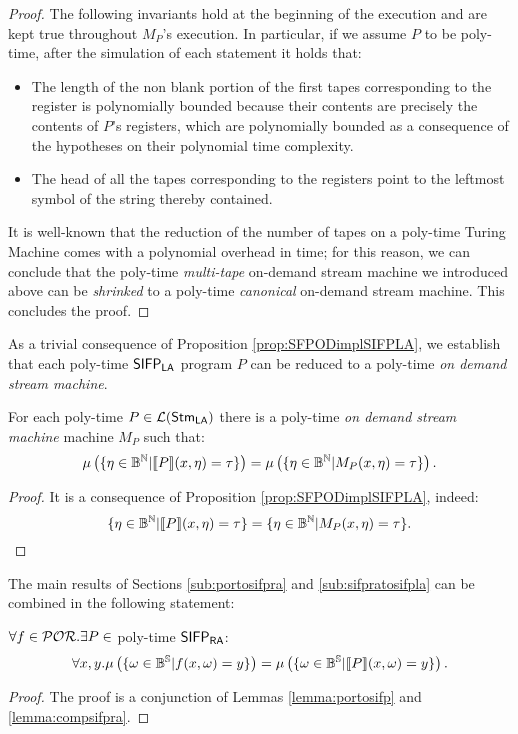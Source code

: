\begin{proof}
The following invariants hold at the beginning of the execution and are kept true
throughout $M_P$'s execution. In particular, if we assume $P$ to be poly-time,
after the simulation of each statement it holds that:

\begin{itemize}
  \item The length of the non blank portion of the first tapes corresponding to
  the register is polynomially bounded because their contents are precisely
  the contents of $P$'s registers, which are polynomially bounded
  as a consequence of the hypotheses on their polynomial time complexity.
  \item The head of all the tapes corresponding to the registers point to the
  leftmost symbol of the string thereby contained.
\end{itemize}

It is well-known that the reduction of the number of tapes on a poly-time Turing Machine
comes with a polynomial overhead in time; for this reason, we can conclude that
the poly-time \emph{multi-tape} on-demand stream machine we introduced above can be
\emph{shrinked}
to a poly-time \emph{canonical} on-demand stream machine. This concludes the proof.
\end{proof}

\noindent
As a trivial consequence of Proposition \ref{prop:SFPODimplSIFPLA}, we establish
that each
poly-time $\mathsf{SIFP_{{\mathsf{LA}}}}$ program $P$ can be reduced to a poly-time \emph{on demand stream machine}.

\begin{cor}
  \label{cor:SIFPLAtoSFPOD}
  For each poly-time $P\in {\mathcal L ({\mathsf{Stm}_{\mathsf{LA}}})}$ there is a poly-time
  \emph{on demand stream machine} machine $M_P$
  such that:
  $$
  \mu\left(\{\eta \in \mathbb{B}^{\mathbb{N}}| \llbracket P\rrbracket (x, \eta)= \tau\}\right)
  =
    \mu\left(\{\eta \in \mathbb{B}^{\mathbb{N}}|  M_P(x, \eta)= \tau\}\right).
  $$
\end{cor}
\begin{proof}
  It is a consequence of Proposition \ref{prop:SFPODimplSIFPLA}, indeed:
  $$
\{\eta \in \mathbb{B}^{\mathbb{N}}| \llbracket P\rrbracket (x, \eta)= \tau\}
  =
    \{\eta \in \mathbb{B}^{\mathbb{N}}|  M_P(x, \eta)= \tau\}.
  $$
\end{proof}
\noindent
The main results of Sections \ref{sub:portosifpra}
and \ref{sub:sifpratosifpla} can be combined in the following statement:

\begin{cor}
  \label{cor:PORtoSIFPRAweak}
  $\forall f \in \mathcal{POR}.\exists P \in$ poly-time $\mathsf{SIFP_{{\mathsf{RA}}}}$:
  $$
  \forall x, y.
  \mu\left(\{\omega \in \mathbb{B}^{\mathbb{S}}| f(x, \omega)=y\}\right)=
  \mu\left(\{\omega \in \mathbb{B}^{\mathbb{S}}| \llbracket P\rrbracket (x, \omega)=y\}\right).
  $$
\end{cor}
\begin{proof}
  The proof is a conjunction of Lemmas \ref{lemma:portosifp} and \ref{lemma:compsifpra}.
\end{proof}

